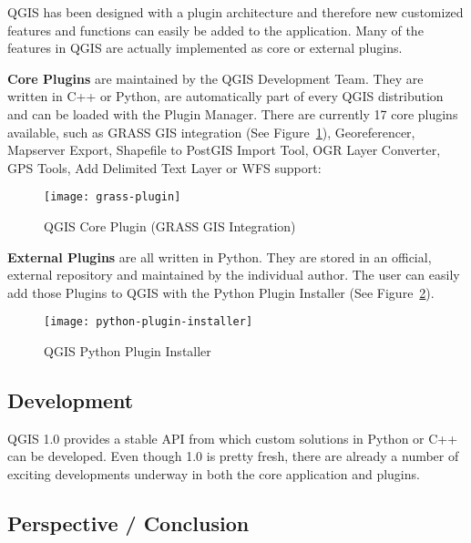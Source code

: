 QGIS has been designed with a plugin architecture and therefore new
customized features and functions can easily be added to the application.
Many of the features in QGIS are actually implemented as core or external
plugins. 

\textbf{Core Plugins} are maintained by the QGIS Development Team. They are
written in C++ or Python, are automatically part of every QGIS distribution
and can be loaded with the Plugin Manager. There are currently 17 core
plugins available, such as GRASS GIS integration (See
Figure~\ref{fig:grass-plugin}), Georeferencer, Mapserver Export, Shapefile to
PostGIS Import Tool, OGR Layer Converter, GPS Tools, Add Delimited Text Layer
or WFS support:  

\begin{figure}[h]
   \begin{center}
   \caption{QGIS Core Plugin (GRASS GIS Integration)}
    \label{fig:grass-plugin}\smallskip
   \texttt{[image: grass-plugin]}
\end{center}
\end{figure}

\textbf{External Plugins} are all written in Python. They are stored in
an official, external repository and maintained by the individual author. The
user can easily add those Plugins to QGIS with the Python Plugin Installer
(See Figure~\ref{fig:python-plugin}).

\begin{figure}[h]
   \begin{center}
   \caption{QGIS Python Plugin Installer}\label{fig:python-plugin}\smallskip
   \texttt{[image: python-plugin-installer]}
\end{center}
\end{figure}


\subsection{Development}

QGIS 1.0 provides a stable API from which custom solutions in Python or C++
can be developed. Even though 1.0 is pretty fresh, there are already a number
of exciting developments underway in both the core application and plugins.

\subsection{Perspective / Conclusion}

